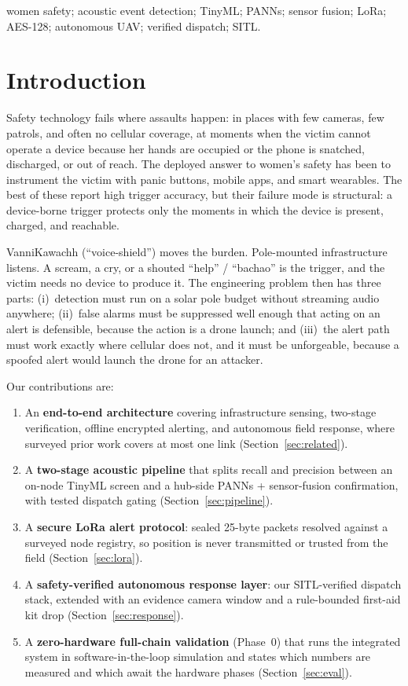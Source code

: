 \documentclass[conference]{IEEEtran}
\begin{document}
\begin{IEEEkeywords}
women safety; acoustic event detection; TinyML; PANNs; sensor fusion;
LoRa; AES-128; autonomous UAV; verified dispatch; SITL.
\end{IEEEkeywords}

\section{Introduction}
\label{sec:intro}

Safety technology fails where assaults happen: in places with few
cameras, few patrols, and often no cellular coverage, at moments when
the victim cannot operate a device because her hands are occupied or
the phone is snatched, discharged, or out of reach. The deployed
answer to women's safety has been to instrument the victim with panic
buttons, mobile apps, and smart wearables. The best of these report
high trigger accuracy, but their failure mode is structural: a
device-borne trigger protects only the moments in which the device is
present, charged, and reachable.

VanniKawachh (``voice-shield'') moves the burden. Pole-mounted
infrastructure listens. A scream, a cry, or a shouted ``help'' /
``bachao'' is the trigger, and the victim needs no device to produce
it. The engineering problem then has three parts: (i)~detection must
run on a solar pole budget without streaming audio anywhere;
(ii)~false alarms must be suppressed well enough that acting on an
alert is defensible, because the action is a drone launch; and
(iii)~the alert path must work exactly where cellular does not, and
it must be unforgeable, because a spoofed alert would launch the
drone for an attacker.

Our contributions are:
\begin{enumerate}
\item An \textbf{end-to-end architecture} covering infrastructure
  sensing, two-stage verification, offline encrypted alerting, and
  autonomous field response, where surveyed prior work covers at most
  one link (Section~\ref{sec:related}).
\item A \textbf{two-stage acoustic pipeline} that splits recall and
  precision between an on-node TinyML screen and a hub-side PANNs +
  sensor-fusion confirmation, with tested dispatch gating
  (Section~\ref{sec:pipeline}).
\item A \textbf{secure LoRa alert protocol}: sealed 25-byte packets
  resolved against a surveyed node registry, so position is never
  transmitted or trusted from the field (Section~\ref{sec:lora}).
\item A \textbf{safety-verified autonomous response layer}: our
  SITL-verified dispatch stack, extended with an evidence camera
  window and a rule-bounded first-aid kit drop
  (Section~\ref{sec:response}).
\item A \textbf{zero-hardware full-chain validation} (Phase~0) that
  runs the integrated system in software-in-the-loop simulation and
  states which numbers are measured and which await the hardware
  phases (Section~\ref{sec:eval}).
\end{enumerate}
\end{document}
